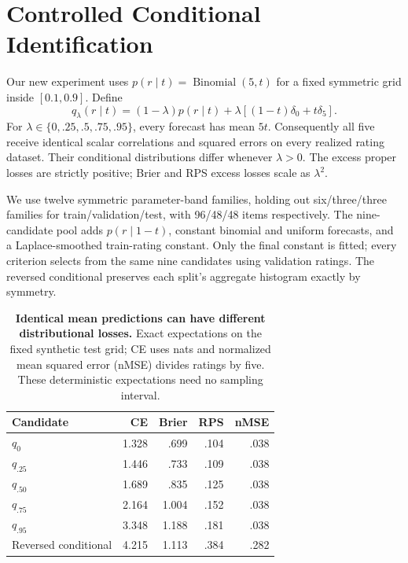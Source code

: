 \section{Controlled Conditional Identification}
\label{sec:toy}
Our new experiment uses $p(r\mid t)=\operatorname{Binomial}(5,t)$ for a fixed symmetric grid inside $[0.1,0.9]$.
Define
\begin{equation}
q_\lambda(r\mid t)=(1-\lambda)p(r\mid t)
 +\lambda[(1-t)\delta_0+t\delta_5].
\end{equation}
For $\lambda\in\{0,.25,.5,.75,.95\}$, every forecast has mean $5t$.
Consequently all five receive identical scalar correlations and squared errors on every realized rating dataset.
Their conditional distributions differ whenever $\lambda>0$.
The excess proper losses are strictly positive; Brier and RPS excess losses scale as $\lambda^2$.

We use twelve symmetric parameter-band families, holding out six/three/three families for train/validation/test, with 96/48/48 items respectively.
The nine-candidate pool adds $p(r\mid1-t)$, constant binomial and uniform forecasts, and a Laplace-smoothed train-rating constant.
Only the final constant is fitted; every criterion selects from the same nine candidates using validation ratings.
The reversed conditional preserves each split's aggregate histogram exactly by symmetry.

\begin{table}[t]
\centering\small\setlength{\tabcolsep}{4pt}
\begin{tabular}{lrrrr}
\toprule
Candidate & CE & Brier & RPS & nMSE \\
\midrule
$q_0$ & 1.328 & .699 & .104 & .038 \\
$q_{.25}$ & 1.446 & .733 & .109 & .038 \\
$q_{.50}$ & 1.689 & .835 & .125 & .038 \\
$q_{.75}$ & 2.164 & 1.004 & .152 & .038 \\
$q_{.95}$ & 3.348 & 1.188 & .181 & .038 \\
Reversed conditional & 4.215 & 1.113 & .384 & .282 \\
\bottomrule
\end{tabular}
\caption{\textbf{Identical mean predictions can have different distributional losses.} Exact expectations on the fixed synthetic test grid; CE uses nats and normalized mean squared error (nMSE) divides ratings by five.
These deterministic expectations need no sampling interval.}
\label{tab:population}
\end{table}

